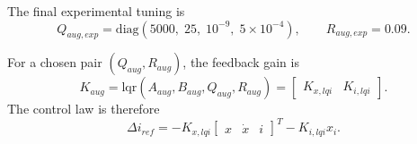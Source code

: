 The final experimental tuning is
\begin{equation}
    Q_{aug,exp}
    =
    \mathrm{diag}
    \left(
        5000,\;
        25,\;
        10^{-9},\;
        5\times10^{-4}
    \right),
    \qquad
    R_{aug,exp}=0.09.
\end{equation}

For a chosen pair $(Q_{aug},R_{aug})$, the feedback gain is
\begin{equation}
    K_{aug}
    =
    \mathrm{lqr}(A_{aug}, B_{aug}, Q_{aug}, R_{aug})
    =
    \begin{bmatrix}
        K_{x,lqi} & K_{i,lqi}
    \end{bmatrix}.
\end{equation}
The control law is therefore
\begin{equation}
    \Delta i_{ref}
    =
    -K_{x,lqi}
    \begin{bmatrix}
         x &  \dot{x} &  i
    \end{bmatrix}^T
    -K_{i,lqi}x_i.
\end{equation}
